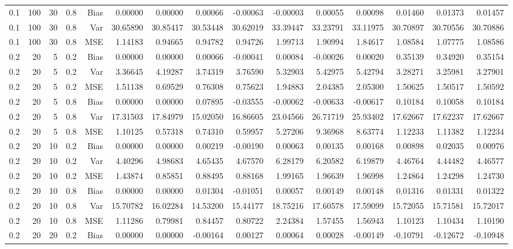 \begin{table}[!htbp]
\begin{tabular}{lrrrrrrrrrrrrrr}
0.1 & 100 & 30 & 0.8 & Bias & 0.00000 & 0.00000 & 0.00066 & -0.00063 & -0.00003 & 0.00055 & 0.00098 & 0.01460 & 0.01373 & 0.01457 \\
0.1 & 100 & 30 & 0.8 & Var & 30.65890 & 30.85417 & 30.53448 & 30.62019 & 33.39447 & 33.23791 & 33.11975 & 30.70897 & 30.70556 & 30.70886 \\
0.1 & 100 & 30 & 0.8 & MSE & 1.14183 & 0.94665 & 0.94782 & 0.94726 & 1.99713 & 1.90994 & 1.84617 & 1.08584 & 1.07775 & 1.08586 \\
0.2 &  20 &  5 & 0.2 & Bias & 0.00000 & 0.00000 & 0.00066 & -0.00041 & 0.00084 & -0.00026 & 0.00020 & 0.35139 & 0.34920 & 0.35154 \\
0.2 &  20 &  5 & 0.2 & Var & 3.36645 & 4.19287 & 3.74319 & 3.76590 & 5.32903 & 5.42975 & 5.42794 & 3.28271 & 3.25981 & 3.27901 \\
0.2 &  20 &  5 & 0.2 & MSE & 1.51138 & 0.69529 & 0.76308 & 0.75623 & 1.94883 & 2.04385 & 2.05300 & 1.50625 & 1.50517 & 1.50592 \\
0.2 &  20 &  5 & 0.8 & Bias & 0.00000 & 0.00000 & 0.07895 & -0.03555 & -0.00062 & -0.00633 & -0.00617 & 0.10184 & 0.10058 & 0.10184 \\
0.2 &  20 &  5 & 0.8 & Var & 17.31503 & 17.84979 & 15.02050 & 16.86605 & 23.04566 & 26.71719 & 25.93402 & 17.62667 & 17.62237 & 17.62667 \\
0.2 &  20 &  5 & 0.8 & MSE & 1.10125 & 0.57318 & 0.74310 & 0.59957 & 5.27206 & 9.36968 & 8.63774 & 1.12233 & 1.11382 & 1.12234 \\
0.2 &  20 & 10 & 0.2 & Bias & 0.00000 & 0.00000 & 0.00219 & -0.00190 & 0.00063 & 0.00135 & 0.00168 & 0.00898 & 0.02035 & 0.00976 \\
0.2 &  20 & 10 & 0.2 & Var & 4.40296 & 4.98683 & 4.65435 & 4.67570 & 6.28179 & 6.20582 & 6.19879 & 4.46764 & 4.44482 & 4.46577 \\
0.2 &  20 & 10 & 0.2 & MSE & 1.43874 & 0.85851 & 0.88495 & 0.88168 & 1.99165 & 1.96639 & 1.96998 & 1.24864 & 1.24298 & 1.24730 \\
0.2 &  20 & 10 & 0.8 & Bias & 0.00000 & 0.00000 & 0.01304 & -0.01051 & 0.00057 & 0.00149 & 0.00148 & 0.01316 & 0.01331 & 0.01322 \\
0.2 &  20 & 10 & 0.8 & Var & 15.70782 & 16.02284 & 14.53200 & 15.44177 & 18.75216 & 17.60578 & 17.59099 & 15.72055 & 15.71581 & 15.72017 \\
0.2 &  20 & 10 & 0.8 & MSE & 1.11286 & 0.79981 & 0.84457 & 0.80722 & 2.24384 & 1.57455 & 1.56943 & 1.10123 & 1.10434 & 1.10190 \\
0.2 &  20 & 20 & 0.2 & Bias & 0.00000 & 0.00000 & -0.00164 & 0.00127 & 0.00064 & 0.00028 & -0.00149 & -0.10791 & -0.12672 & -0.10948 \\

\end{tabular}
\end{table}

